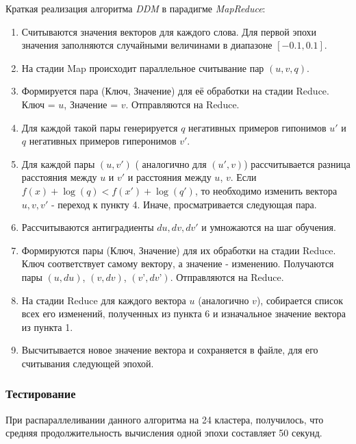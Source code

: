Краткая реализация алгоритма \textit{DDM} в парадигме \textit{MapReduce}:

\begin{enumerate}
\item Считываются значения векторов для каждого слова. Для первой эпохи значения
заполняются случайными величинами в диапазоне $[-0.1, 0.1]$.

\item На стадии Map происходит параллельное считывание пар $(u, v, q)$.

\item Формируется пара (Ключ, Значение) для её обработки на стадии Reduce. Ключ = $u$,
Значение = $v$. Отправляются на Reduce.

\item Для каждой такой пары генерируется $q$ негативных примеров гипонимов $u'$ и $q$
негативных примеров гиперонимов $v'$.

\item Для каждой пары $(u, v')$ ( аналогично для $(u', v)$) рассчитывается разница расстояния между $u$ и $v'$ и расстояния между $u$, $v$. Если $f(x) + \log(q) < f(x') + \log(q')$, то необходимо изменить вектора $u, v, v'$ - переход к пункту 4. Иначе, просматривается следующая
пара.

\item Рассчитываются антиградиенты $du, dv, dv'$ и умножаются на шаг обучения.

\item Формируются пары (Ключ, Значение) для их обработки на стадии Reduce. Ключ
соответствует самому вектору, а значение - изменению. Получаются пары $(u, du)$, $(v,
dv)$, $(v’, dv’)$. Отправляются на Reduce.

\item На стадии Reduce для каждого вектора $u$ (аналогично $v$), собирается список всех
его изменений, полученных из пункта 6 и изначальное значение вектора из пункта 1.

\item Высчитывается новое значение вектора и сохраняется в файле, для его считывания
следующей эпохой.
\end{enumerate}


\subsubsection{Тестирование}

При распараллеливании данного алгоритма на 24 кластера, получилось, что средняя
продолжительность вычисления одной эпохи составляет 50 секунд.

